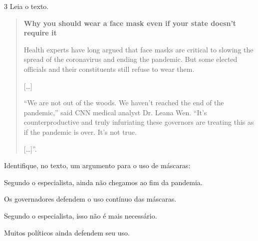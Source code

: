 \num{3} Leia o texto.


\begin{quote}
\textbf{Why you should wear a face mask even if your state doesn't
require it}

Health experts have long argued that face masks are critical to slowing
the spread of the coronavirus and ending the pandemic. But some elected
officials and their constituents still refuse to wear them.

{[}\ldots{}{]}

``We are not out of the woods. We haven't reached the end of the
pandemic,'' said CNN medical analyst Dr. Leana Wen. ``It's
counterproductive and truly infuriating these governors are treating
this as if the pandemic is over. It's not true.

{[}\ldots{}{]}''.

\end{quote}

Identifique, no texto, um argumento para o uso de máscaras:

\begin{escolha}
\item Segundo o especialista, ainda não chegamos ao fim da pandemia.

\item Os governadores defendem o uso contínuo das máscaras.

\item Segundo o especialista, isso não é mais necessário.

\item Muitos políticos ainda defendem seu uso.
\end{escolha}


